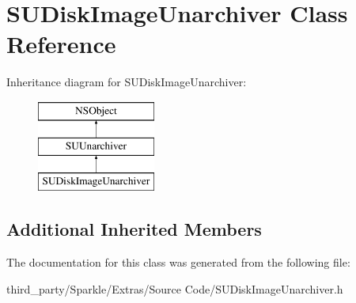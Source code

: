 \hypertarget{interface_s_u_disk_image_unarchiver}{}\section{S\+U\+Disk\+Image\+Unarchiver Class Reference}
\label{interface_s_u_disk_image_unarchiver}
Inheritance diagram for S\+U\+Disk\+Image\+Unarchiver\+:\begin{figure}[H]
\begin{center}
\leavevmode
\includegraphics[height=3.000000cm]{interface_s_u_disk_image_unarchiver}
\end{center}
\end{figure}
\subsection*{Additional Inherited Members}


The documentation for this class was generated from the following file\+:\begin{DoxyCompactItemize}
\item 
third\+\_\+party/\+Sparkle/\+Extras/\+Source Code/S\+U\+Disk\+Image\+Unarchiver.\+h\end{DoxyCompactItemize}
